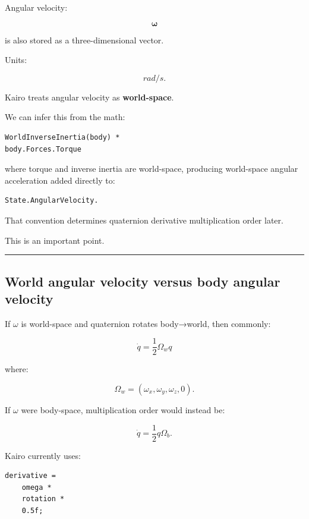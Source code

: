 Angular velocity:

\[
\boldsymbol\omega
\]

is also stored as a three-dimensional vector.

Units:

\[
rad/s.
\]

Kairo treats angular velocity as \textbf{world-space}.

We can infer this from the math:

\begin{verbatim}
WorldInverseInertia(body) *
body.Forces.Torque
\end{verbatim}

where torque and inverse inertia are world-space, producing world-space angular acceleration added directly to:

\begin{verbatim}
State.AngularVelocity.
\end{verbatim}

That convention determines quaternion derivative multiplication order later.

This is an important point.

\begin{center}\rule{0.5\linewidth}{0.5pt}\end{center}

\subsection{World angular velocity versus body angular velocity}\label{06-engine-ii-ch037-world-angular-velocity-versus-body-angular-velocity}

\hypertarget{06-engine-ii-ch037-world-angular-velocity-versus-body-angular-velocity}{}

If \(\omega\) is world-space and quaternion rotates body→world, then commonly:

\[
\boxed{
\dot q
=
\frac12
\Omega_w q
}
\]

where:

\[
\Omega_w=(\omega_x,\omega_y,\omega_z,0).
\]

If \(\omega\) were body-space, multiplication order would instead be:

\[
\dot q
=
\frac12
q\Omega_b.
\]

Kairo currently uses:

\begin{verbatim}
derivative =
    omega *
    rotation *
    0.5f;
\end{verbatim}

